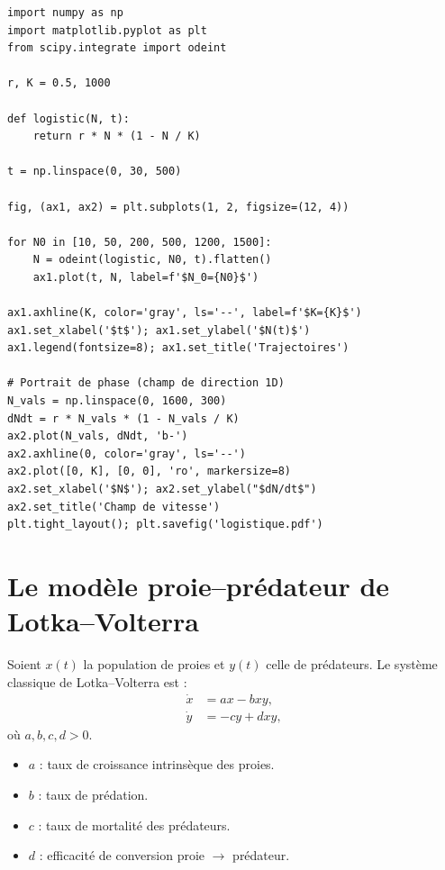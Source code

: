 \begin{codeblock}[title=\textbf{Croissance logistique et portrait de phase}]
\begin{verbatim}
import numpy as np
import matplotlib.pyplot as plt
from scipy.integrate import odeint

r, K = 0.5, 1000

def logistic(N, t):
    return r * N * (1 - N / K)

t = np.linspace(0, 30, 500)

fig, (ax1, ax2) = plt.subplots(1, 2, figsize=(12, 4))

for N0 in [10, 50, 200, 500, 1200, 1500]:
    N = odeint(logistic, N0, t).flatten()
    ax1.plot(t, N, label=f'$N_0={N0}$')

ax1.axhline(K, color='gray', ls='--', label=f'$K={K}$')
ax1.set_xlabel('$t$'); ax1.set_ylabel('$N(t)$')
ax1.legend(fontsize=8); ax1.set_title('Trajectoires')

# Portrait de phase (champ de direction 1D)
N_vals = np.linspace(0, 1600, 300)
dNdt = r * N_vals * (1 - N_vals / K)
ax2.plot(N_vals, dNdt, 'b-')
ax2.axhline(0, color='gray', ls='--')
ax2.plot([0, K], [0, 0], 'ro', markersize=8)
ax2.set_xlabel('$N$'); ax2.set_ylabel("$dN/dt$")
ax2.set_title('Champ de vitesse')
plt.tight_layout(); plt.savefig('logistique.pdf')
\end{verbatim}
\end{codeblock}

\section{Le mod\`ele proie--pr\'edateur de Lotka--Volterra}
\label{sec:lotka_volterra}

\begin{definition}
Soient $x(t)$ la population de proies et $y(t)$ celle de pr\'edateurs.
Le syst\`eme classique de Lotka--Volterra est :
\begin{align}
  \dot{x} &= ax - bxy, \label{eq:lv_prey} \\
  \dot{y} &= -cy + dxy, \label{eq:lv_pred}
\end{align}
o\`u $a,b,c,d>0$.
\begin{itemize}
  \item $a$ : taux de croissance intrins\`eque des proies.
  \item $b$ : taux de pr\'edation.
  \item $c$ : taux de mortalit\'e des pr\'edateurs.
  \item $d$ : efficacit\'e de conversion proie $\to$ pr\'edateur.
\end{itemize}
\end{definition}

